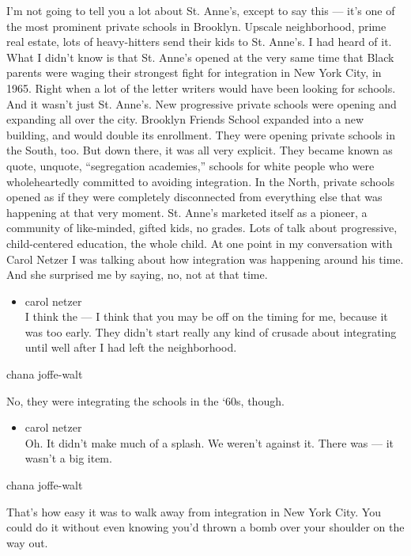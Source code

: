 I'm not going to tell you a lot about St. Anne's, except to say this ---
it's one of the most prominent private schools in Brooklyn. Upscale
neighborhood, prime real estate, lots of heavy-hitters send their kids
to St. Anne's. I had heard of it. What I didn't know is that St. Anne's
opened at the very same time that Black parents were waging their
strongest fight for integration in New York City, in 1965. Right when a
lot of the letter writers would have been looking for schools. And it
wasn't just St. Anne's. New progressive private schools were opening and
expanding all over the city. Brooklyn Friends School expanded into a new
building, and would double its enrollment. They were opening private
schools in the South, too. But down there, it was all very explicit.
They became known as quote, unquote, ``segregation academies,'' schools
for white people who were wholeheartedly committed to avoiding
integration. In the North, private schools opened as if they were
completely disconnected from everything else that was happening at that
very moment. St. Anne's marketed itself as a pioneer, a community of
like-minded, gifted kids, no grades. Lots of talk about progressive,
child-centered education, the whole child. At one point in my
conversation with Carol Netzer I was talking about how integration was
happening around his time. And she surprised me by saying, no, not at
that time.

\begin{itemize}
\tightlist
\item
  carol netzer\\
  I think the --- I think that you may be off on the timing for me,
  because it was too early. They didn't start really any kind of crusade
  about integrating until well after I had left the neighborhood.
\end{itemize}

chana joffe-walt

No, they were integrating the schools in the `60s, though.

\begin{itemize}
\tightlist
\item
  carol netzer\\
  Oh. It didn't make much of a splash. We weren't against it. There was
  --- it wasn't a big item.
\end{itemize}

chana joffe-walt

That's how easy it was to walk away from integration in New York City.
You could do it without even knowing you'd thrown a bomb over your
shoulder on the way out.

